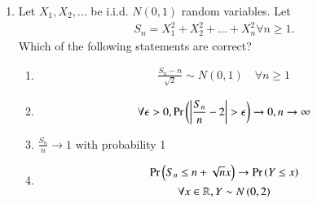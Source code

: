 \begin{enumerate}[label=\thesection.\arabic*.,ref=\thesection.\theenumi]
\item Let $X_1,X_2, \dots$ be i.i.d. $N(0,1)$ random variables. Let 
\begin{align}
S_{n}=X_{1}^2+X_{2}^2+\dots+X_{n}^2 \forall n \geq 1. 
\end{align}
Which of the following statements are correct?
%
\begin{enumerate}
\setlength\itemsep{1em}
\item 
\begin{align}
    \frac{S_{n}-n}{\sqrt{2}}\sim N(0,1) \quad  \forall n\geq 1
\end{align}
\item 
\begin{align}
    \forall \epsilon > 0,\Pr\left(\left\vert\frac{S_n}{n}-2\right\vert>\epsilon\right)\to 0, n \to \infty
\end{align}

\item $\frac{S_{n}}{n} \to 1$ with probability 1
\item 
\begin{multline}
    \Pr\left({S_{n} \leq n+\sqrt{n}x}\right) \to \Pr\left({Y \leq x}\right)
    \\
    \forall x\in \mathbb{R}, Y \sim N\left(0,2\right)
\end{multline}
%
\end{enumerate}


%
\end{enumerate}
